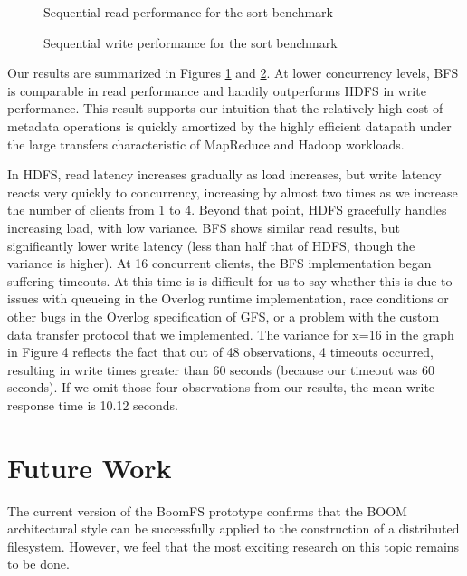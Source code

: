\documentclass{article}
\begin{document}
\begin{figure}
\centering
{}
\caption{Sequential read performance for the sort benchmark}
\label{fig:big-read-perf}
\end{figure}
\begin{figure}
\centering
{}
\caption{Sequential write performance for the sort benchmark}
\label{fig:big-write-perf}
\end{figure}
Our results are summarized in Figures \ref{fig:big-read-perf} and
\ref{fig:big-write-perf}.  At lower concurrency levels, BFS is
comparable in read performance and handily outperforms HDFS in write
performance.  This result supports our intuition that the relatively
high cost of metadata operations is quickly amortized by the highly
efficient datapath under the large transfers characteristic of
MapReduce and Hadoop workloads.

In HDFS, read latency increases gradually as load increases, but write
latency reacts very quickly to concurrency, increasing by almost two
times as we increase the number of clients from 1 to 4.  Beyond that
point, HDFS gracefully handles increasing load, with low variance.
BFS shows similar read results, but significantly lower write latency
(less than half that of HDFS, though the variance is higher).  At 16
concurrent clients, the BFS implementation began suffering timeouts.
At this time is is difficult for us to say whether this is due to
issues with queueing in the Overlog runtime implementation, race
conditions or other bugs in the Overlog specification of GFS, or a
problem with the custom data transfer protocol that we implemented.
The variance for x=16 in the graph in Figure 4 reflects the fact that
out of 48 observations, 4 timeouts occurred, resulting in write times
greater than 60 seconds (because our timeout was 60 seconds).  If we
omit those four observations from our results, the mean write response
time is 10.12 seconds.

\section{Future Work}
\label{future-work}
The current version of the BoomFS prototype confirms that the BOOM
architectural style can be successfully applied to the construction of
a distributed filesystem. However, we feel that the most exciting
research on this topic remains to be done.
\end{document}
